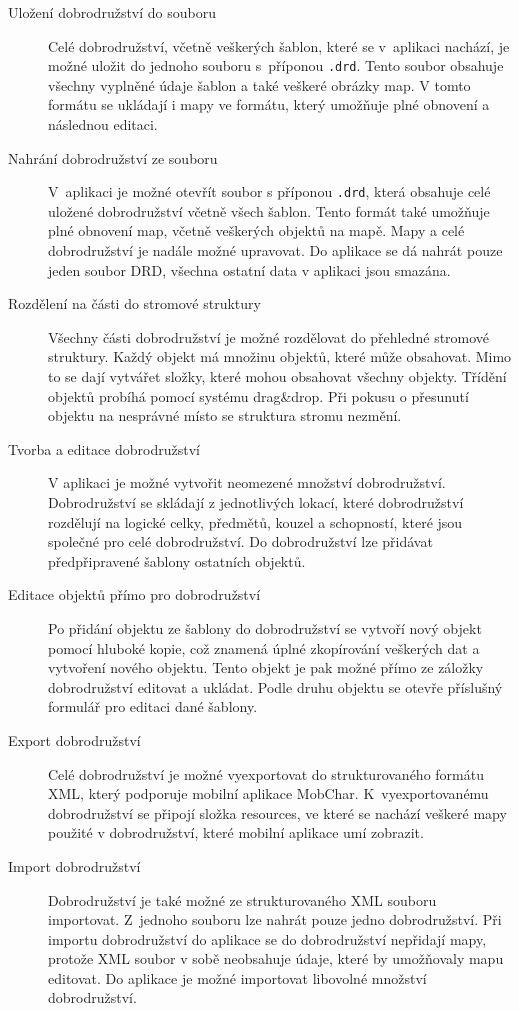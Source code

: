 \documentclass[thesis=B,czech]{resources/FITthesis}[2012/06/26]
\begin{document}
	\begin{description}
		\item[Uložení dobrodružství do souboru]
Celé dobrodružství, včetně veškerých šablon, které se v~aplikaci nachází, je možné uložit do jednoho souboru s~příponou \texttt{.drd}. Tento soubor obsahuje všechny vyplněné údaje šablon a také veškeré obrázky map. V tomto formátu se ukládají i mapy ve formátu, který umožňuje plné obnovení a následnou editaci. 

		\item[Nahrání dobrodružství ze souboru]
V~aplikaci je možné otevřít soubor s příponou \texttt{.drd}, která obsahuje celé uložené dobrodružství včetně všech šablon. Tento formát také umožňuje plné obnovení map, včetně veškerých objektů na mapě. Mapy a celé dobrodružství je nadále možné upravovat. Do aplikace se dá nahrát pouze jeden soubor DRD, všechna ostatní data v aplikaci jsou smazána.
 
		\item[Rozdělení na části do stromové struktury]
		Všechny části dobrodružství je možné rozdělovat do přehledné stromové struktury. Každý objekt má množinu objektů, které může obsahovat. Mimo to se dají vytvářet složky, které mohou obsahovat všechny objekty. Třídění objektů probíhá pomocí systému drag\&drop. Při pokusu o přesunutí objektu na nesprávné místo se struktura stromu nezmění. 
		
		\item[Tvorba a editace dobrodružství]
V aplikaci je možné vytvořit neomezené množství dobrodružství. Dobrodružství se skládají z jednotlivých lokací, které dobrodružství rozdělují na logické celky, předmětů, kouzel a schopností, které jsou společné pro celé dobrodružství. Do dobrodružství lze přidávat předpřipravené šablony ostatních objektů. 

		\item[Editace objektů přímo pro dobrodružství]
Po přidání objektu ze šablony do dobrodružství se vytvoří nový objekt pomocí hluboké kopie, což znamená úplné zkopírování veškerých dat a vytvoření nového objektu. Tento objekt je pak možné přímo ze záložky dobrodružství editovat a ukládat. Podle druhu objektu se otevře příslušný formulář pro editaci dané šablony.

		\item[Export dobrodružství]
		Celé dobrodružství je možné vyexportovat do strukturovaného formátu XML, který podporuje mobilní aplikace MobChar. K~vyexportovanému dobrodružství se připojí složka resources, ve které se nachází veškeré mapy použité v dobrodružství, které mobilní aplikace umí zobrazit. 
		
		\item[Import dobrodružství]
		Dobrodružství je také možné ze strukturovaného XML souboru importovat. Z~jednoho souboru lze nahrát pouze jedno dobrodružství. Při importu dobrodružství do aplikace se do dobrodružství nepřidají mapy, protože XML soubor v sobě neobsahuje údaje, které by umožňovaly mapu editovat. Do aplikace je možné importovat libovolné množství dobrodružství.
	\end{description}
	
\end{document}
